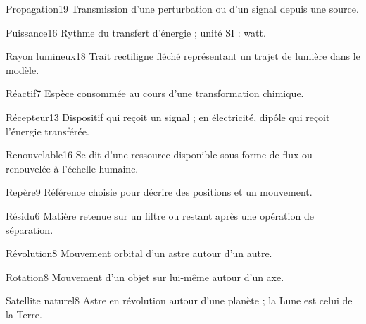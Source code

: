 \documentclass[12pt,twoside,openany]{book}
\begin{document}
\begin{pcLexique}{Propagation}{19}
Transmission d’une perturbation ou d’un signal depuis une source.\par
\end{pcLexique}
\begin{pcLexique}{Puissance}{16}
Rythme du transfert d’énergie ; unité SI : watt.\par
\end{pcLexique}
\begin{pcLexique}{Rayon lumineux}{18}
Trait rectiligne fléché représentant un trajet de lumière dans le modèle.\par
\end{pcLexique}
\begin{pcLexique}{Réactif}{7}
Espèce consommée au cours d’une transformation chimique.\par
\end{pcLexique}
\begin{pcLexique}{Récepteur}{13}
Dispositif qui reçoit un signal ; en électricité, dipôle qui reçoit l’énergie transférée.\par
\end{pcLexique}
\begin{pcLexique}{Renouvelable}{16}
Se dit d’une ressource disponible sous forme de flux ou renouvelée à l’échelle humaine.\par
\end{pcLexique}
\begin{pcLexique}{Repère}{9}
Référence choisie pour décrire des positions et un mouvement.\par
\end{pcLexique}
\begin{pcLexique}{Résidu}{6}
Matière retenue sur un filtre ou restant après une opération de séparation.\par
\end{pcLexique}
\begin{pcLexique}{Révolution}{8}
Mouvement orbital d’un astre autour d’un autre.\par
\end{pcLexique}
\begin{pcLexique}{Rotation}{8}
Mouvement d’un objet sur lui-même autour d’un axe.\par
\end{pcLexique}
\begin{pcLexique}{Satellite naturel}{8}
Astre en révolution autour d’une planète ; la Lune est celui de la Terre.\par
\end{pcLexique}
\end{document}

